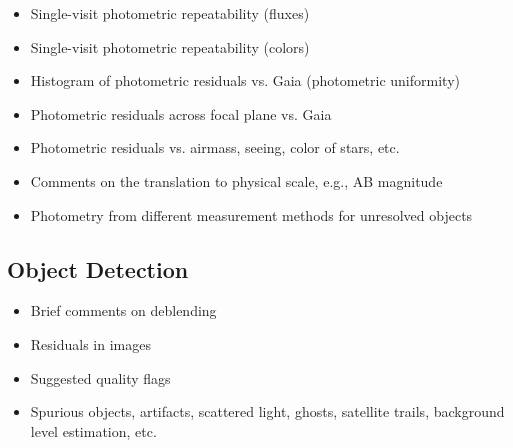 \begin{itemize}

\item Single-visit photometric repeatability (fluxes)

\item Single-visit photometric repeatability (colors)

\item Histogram of photometric residuals vs. Gaia (photometric uniformity)

\item Photometric residuals across focal plane vs. Gaia

\item Photometric residuals vs. airmass, seeing, color of stars, etc.

\item Comments on the translation to physical scale, e.g., AB magnitude 

\item Photometry from different measurement methods for unresolved objects

\end{itemize}






\subsection{Object Detection}

\begin{itemize}

\item Brief comments on deblending

\item Residuals in images

\item Suggested quality flags

\item Spurious objects, artifacts, scattered light, ghosts, satellite trails, background level estimation, etc.

\end{itemize}

